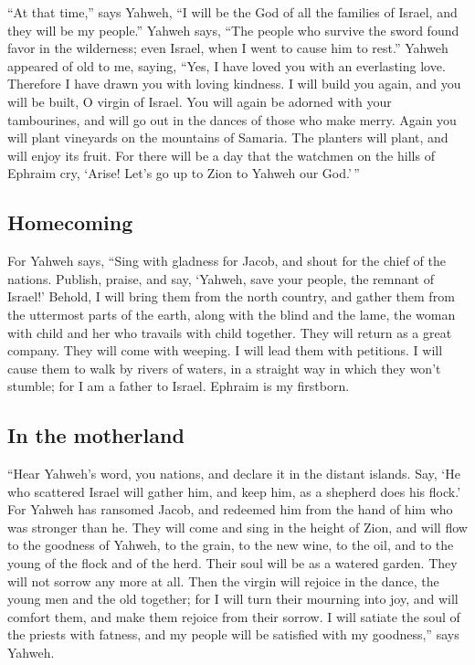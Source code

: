 ``At that time,'' says Yahweh, ``I will be the God of all
the families of Israel, and they will be my people.'' 
Yahweh says, ``The people who survive the sword found favor in the
wilderness; even Israel, when I went to cause him to rest.''
 Yahweh appeared of old to me, saying, ``Yes, I have loved
you with an everlasting love. Therefore I have drawn you with loving
kindness.  I will build you again, and you will be built,
O virgin of Israel. You will again be adorned with your tambourines, and
will go out in the dances of those who make merry.  Again
you will plant vineyards on the mountains of Samaria. The planters will
plant, and will enjoy its fruit.  For there will be a day
that the watchmen on the hills of Ephraim cry, `Arise! Let's go up to
Zion to Yahweh our God.'\,''

\hypertarget{homecoming}{%
\subsection{Homecoming}\label{homecoming}}

 For Yahweh says, ``Sing with gladness for Jacob, and
shout for the chief of the nations. Publish, praise, and say, `Yahweh,
save your people, the remnant of Israel!'  Behold, I will
bring them from the north country, and gather them from the uttermost
parts of the earth, along with the blind and the lame, the woman with
child and her who travails with child together. They will return as a
great company.  They will come with weeping. I will lead
them with petitions. I will cause them to walk by rivers of waters, in a
straight way in which they won't stumble; for I am a father to Israel.
Ephraim is my firstborn.

\hypertarget{in-the-motherland}{%
\subsection{In the motherland}\label{in-the-motherland}}

 ``Hear Yahweh's word, you nations, and declare it in the
distant islands. Say, `He who scattered Israel will gather him, and keep
him, as a shepherd does his flock.'  For Yahweh has
ransomed Jacob, and redeemed him from the hand of him who was stronger
than he.  They will come and sing in the height of Zion,
and will flow to the goodness of Yahweh, to the grain, to the new wine,
to the oil, and to the young of the flock and of the herd. Their soul
will be as a watered garden. They will not sorrow any more at all.
 Then the virgin will rejoice in the dance, the young men
and the old together; for I will turn their mourning into joy, and will
comfort them, and make them rejoice from their sorrow.  I
will satiate the soul of the priests with fatness, and my people will be
satisfied with my goodness,'' says Yahweh.

